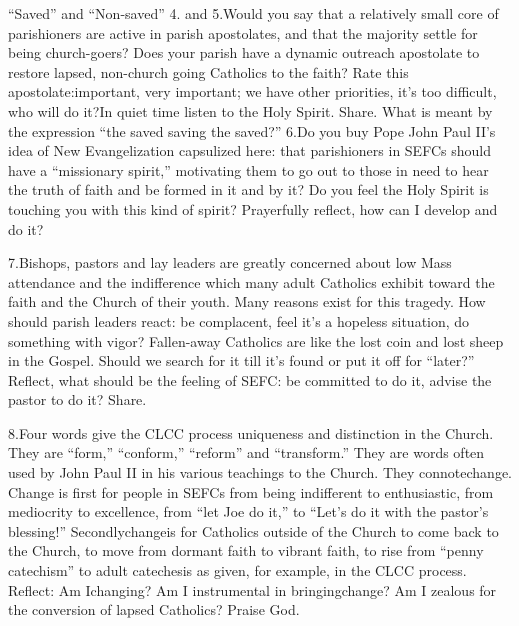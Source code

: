\documentclass[oneside]{book}
\begin{document}
``Saved'' and ``Non-saved''
4. and 5.Would you say that a relatively small core of parishioners are active
in parish apostolates, and that the majority settle for being church-goers? Does
your parish have a dynamic outreach apostolate to restore lapsed, non-church
going Catholics to the faith? Rate this apostolate:important, very important; we
have other priorities, it's too difficult, who will do it?In quiet time listen
to the Holy Spirit. Share.
What is meant by the expression ``the saved saving the saved?''
6.Do you buy Pope John Paul II's idea of New Evangelization capsulized here:
that parishioners in SEFCs should have a ``missionary spirit,'' motivating them
to go out to those in need to hear the truth of faith and be formed in it and by
it? Do you feel the Holy Spirit is touching you with this kind of spirit?
Prayerfully reflect, how can I develop and do it?

7.Bishops, pastors and lay leaders are greatly concerned about low Mass
attendance and the indifference which many adult Catholics exhibit toward the
faith and the Church of their youth. Many reasons exist for this tragedy. How
should parish leaders react: be complacent, feel it's a hopeless situation, do
something with vigor? Fallen-away Catholics are like the lost coin and lost
sheep in the Gospel. Should we search for it till it's found or put it off for
``later?'' Reflect, what should be the feeling of SEFC: be committed to do it,
advise the pastor to do it? Share.

8.Four words give the CLCC process uniqueness and distinction in the
Church. They are ``form,'' ``conform,'' ``reform'' and ``transform.'' They are
words often used by John Paul II in his various teachings to the Church. They
connotechange. Change is first for people in SEFCs from being indifferent to
enthusiastic, from mediocrity to excellence, from ``let Joe do it,'' to ``Let's
do it with the pastor's blessing!'' Secondlychangeis for Catholics outside of
the Church to come back to the Church, to move from dormant faith to vibrant
faith, to rise from ``penny catechism'' to adult catechesis as given, for
example, in the CLCC process. Reflect: Am Ichanging? Am I instrumental in
bringingchange? Am I zealous for the conversion of lapsed Catholics? Praise God.
\end{document}
